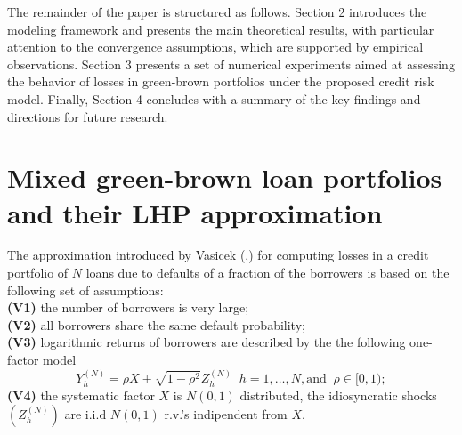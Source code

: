 \documentclass[preprint,12pt]{article}
\begin{document}
The remainder of the paper is structured as follows. Section 2 introduces the modeling framework and presents the main theoretical results, with particular attention to the convergence assumptions, which are supported by empirical observations. Section 3 presents a set of numerical experiments aimed at assessing the behavior of losses in green-brown portfolios under the proposed credit risk model. Finally, Section 4 concludes with a summary of the key findings and directions for future research.


\section{Mixed green-brown loan portfolios and their LHP approximation}
The approximation introduced by Vasicek (\cite{vas1},\cite{vas2}) for computing losses in a credit portfolio of $N$ loans due to defaults of a fraction of the borrowers is based on the following set of assumptions:\\

\noindent
 {\bf{(V1)}} the number of borrowers is very large;\\
 {\bf{(V2)}} all borrowers share the same default probability;\\
 {\bf{(V3)}} logarithmic returns of borrowers are described by  the the following one-factor model
\begin{equation}\label{basic}
Y^{(N)}_h=\rho X+\sqrt{1-\rho^2}Z^{(N)}_h\;\;h=1,\ldots,N, \text{and}\;\;\rho\in[0,1);
\end{equation}
 {\bf{(V4)}} the systematic factor $X$ is $N(0,1)$ distributed, the  idiosyncratic shocks $(Z^{(N)}_h)$ are i.i.d  $N(0,1)$ r.v.'s indipendent from $X$.\\ 
 
\end{document}
